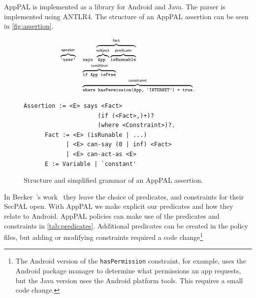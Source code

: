 \documentclass[]{llncs}
\begin{document}
AppPAL is implemented as a library for Android and Java.
The parser is implemented using ANTLR4.
The structure of an AppPAL assertion can be seen in \autoref{fig:assertion}.

\begin{figure}
  \newcommand{\bracetext}[1]{\text{\sffamily #1}}
  \newcommand{\smalltext}[1]{\text{\ttfamily\scriptsize #1}}
  \centering
  \begin{minipage}{0.49\linewidth}
    \begin{equation*}\small
      \begin{array}{r l}\footnotesize
        \overbrace{\smalltext{`user'}}^{\bracetext{speaker}} &
        \smalltext{ says }\overbrace{\overbrace{\smalltext{ App }}^{\bracetext{subject}}\overbrace{\smalltext{ isRunnable}}^{\bracetext{predicate}}}^{\bracetext{fact}} \\
        & \overbrace{\smalltext{ if App isFree}}^{\bracetext{condition}} \\
        & \overbrace{\smalltext{ where hasPermission(App, `INTERNET') = true}}^{\bracetext{constraint}}.
      \end{array}
    \end{equation*}
  \end{minipage}
  \begin{minipage}{0.49\linewidth}
    \begin{lstlisting}[basicstyle=\ttfamily\scriptsize,keywordstyle=\ttfamily\scriptsize]
      Assertion := <E> says <Fact>
                     (if (<Fact>,)+)?
                     (where <Constraint>)?.
      Fact := <E> (isRunable | ...)
            | <E> can-say (0 | inf) <Fact>
            | <E> can-act-as <E>
      E := Variable | `constant'
    \end{lstlisting}
  \end{minipage}
  \caption{Structure and simplified grammar of an AppPAL assertion.}
  \label{fig:assertion}
\end{figure}



In Becker~\etal's work~\cite{Becker:2006vh} they leave the choice of predicates, and constraints for their SecPAL open.
With AppPAL we make explicit our predicates and how they relate to Android.
AppPAL policies can make use of the predicates and constraints in \autoref{tab:predicates}.
Additional predicates can be created in the policy files, but adding or modifying constraints required a code change\footnote{The Android version of the \texttt{hasPermission} constraint, for example, uses the Android package manager to determine what permissions an app requests, but the Java version uses the Android platform tools.  This requires a small code change.}
\end{document}
